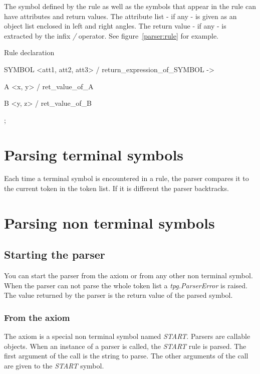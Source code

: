 The symbol defined by the rule as well as the symbols that appear in the rule can have attributes and return values.
The attribute list - if any - is given as an object list enclosed in left and right angles.
The return value - if any - is extracted by the infix \emph{/} operator.
See figure~\ref{parser:rule} for example.

\begin{code}
\caption{Rule declaration}										\label{parser:rule}
\begin{verbatimtab}[4]
	SYMBOL <att1, att2, att3> / return_expression_of_SYMBOL ->

		A <x, y> / ret_value_of_A

		B <y, z> / ret_value_of_B

		;
\end{verbatimtab}
\end{code}

\section{Parsing terminal symbols}

Each time a terminal symbol is encountered in a rule, the parser compares it to the current token in the token list. If it is different the parser backtracks.

\section{Parsing non terminal symbols}							\label{parser:nterm}

\subsection{Starting the parser}

You can start the parser from the axiom or from any other non terminal symbol.
When the parser can not parse the whole token list a \emph{tpg.ParserError} is raised.
The value returned by the parser is the return value of the parsed symbol.

\subsubsection{From the axiom}

The axiom is a special non terminal symbol named \emph{START}.
Parsers are callable objects.
When an instance of a parser is called, the \emph{START} rule is parsed.
The first argument of the call is the string to parse.
The other arguments of the call are given to the \emph{START} symbol.

